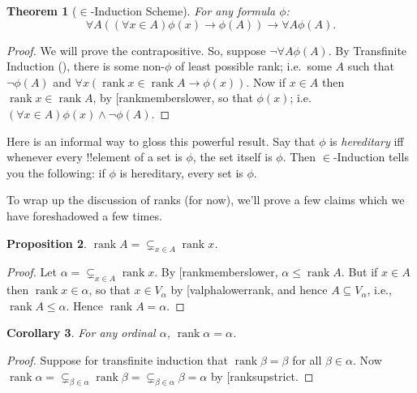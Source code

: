 \documentclass[10pt,a4paper]{article}
\makeatletter
\theoremstyle{plain}
\newtheorem{thm}{Theorem}[section]
\newtheorem{prop}[thm]{Proposition}
\newtheorem{cor}[thm]{Corollary}
\theoremstyle{definition}
\theoremstyle{remark}
\newcommand*{\ollabel}[1]{\label{#1}}
\newcommand{\olref}{\@ifnextchar[{\olref@i}{\olref@final}}
\def\olref@i[#1]{\@ifnextchar[{\olref@ii}{\olref@final}}
\def\olref@ii[#1]{\@ifnextchar[{\olref@iii}{\olref@final}}
\def\olref@iii[#1]{\olref@final}
\def\olref@final#1{\ref{#1}}
\providecommand{\lif}{\mathbin{\rightarrow}}
\providecommand{\Setabs}[2]{\{\, #1 \mid #2 \,\}}
\providecommand{\supstrict}{\subsetneq}
\providecommand{\setrank}{\operatorname{rank}}
\makeatother
\begin{document}
\begin{thm}[$\in$-Induction Scheme] 
For any formula $\phi$:
\[
	\forall A((\forall x \in A)\phi(x) \lif \phi(A)) \lif \forall A \phi(A).
\]
\end{thm}

\begin{proof}
We will prove the contrapositive. So, suppose $\lnot \forall A
\phi(A)$. By Transfinite Induction
(\olref[ordinals][basic]{ordinductionschema}), there
is some non-$\phi$ of least possible rank; i.e.\ some $A$
such that $\lnot \phi(A)$ and $\forall x(\setrank{x} \in \setrank{A}
\lif \phi(x))$. Now if $x \in A$ then $\setrank{x} \in
\setrank{A}$, by \olref{rankmemberslower}, so that $\phi(x)$; i.e.\ $(\forall x \in
A)\phi(x) \land \lnot \phi(A)$.
\end{proof}\noindent Here is an informal way to gloss this powerful
result. Say that $\phi$ is \emph{hereditary} iff whenever every
!!{element} of a set is $\phi$, the set itself is $\phi$. Then
$\in$-Induction tells you the following: if $\phi$ is hereditary,
every set is $\phi$.

To wrap up the discussion of ranks (for now), we'll prove a few
claims which we have foreshadowed a few times. 

\begin{prop}\ollabel{ranksupstrict}
$\setrank{A} = \supstrict_{x \in A}\setrank{x}$.
\end{prop}

\begin{proof}
Let $\alpha = \supstrict_{x \in A}\setrank{x}$. By
\olref{rankmemberslower}, $\alpha \leq \setrank{A}$. But if $x \in A$
then $\setrank{x} \in \alpha$, so that $x \in V_\alpha$ by \olref{valphalowerrank}, and hence $A
\subseteq V_\alpha$, i.e., $\setrank{A} \leq \alpha$. Hence
$\setrank{A} = \alpha$.
\end{proof}

\begin{cor}\ollabel{ordsetrankalpha}
For any ordinal $\alpha$, $\setrank{\alpha} = \alpha$.
\end{cor}

\begin{proof}
Suppose for transfinite induction that $\setrank{\beta} = \beta$ for
all $\beta \in \alpha$. Now $\setrank{\alpha} = \supstrict_{\beta \in
\alpha}\setrank{\beta} = \supstrict_{\beta \in \alpha}\beta = \alpha$
by \olref{ranksupstrict}.
%
\end{proof}
\end{document}
